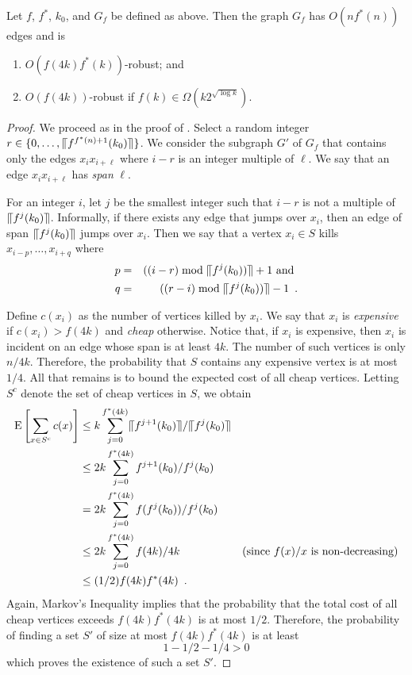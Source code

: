 \documentclass{patmorin}
\begin{document}
\begin{thm}
  Let $f$, $f^*$, $k_0$, and $G_f$ be defined as above.  Then the graph
  $G_f$ has $O(nf^*(n))$ edges and is
  \begin{enumerate}
    \item $O(f(4k)f^*(k))$-robust; and 
    \item $O(f(4k))$-robust if $f(k)\in\Omega(k2^{\sqrt{\log k}})$.
  \end{enumerate}
\end{thm}

\begin{proof}
  We proceed as in the proof of .  Select a random
  integer $r\in\{0,\ldots,\llceil f^{f^*(n)+1}(k_0)\rrceil\}$.  We consider the
  subgraph $G'$ of $G_f$ that contains only the edges $x_ix_{i+\ell}$
  where $i-r$ is an integer multiple of $\ell$.  We say that an edge
  $x_ix_{i+\ell}$ has \emph{span} $\ell$.

  For an integer $i$, let $j$ be the smallest integer such that $i-r$ is
  not a multiple of $\llceil f^j(k_0)\rrceil$.  Informally, if there exists any
  edge that jumps over $x_i$, then an edge of span $\llceil f^j(k_0)\rrceil$
  jumps over $x_i$.  Then we say that a vertex $x_i\in S$ kills
  $x_{i-p},\ldots,x_{i+q}$ where
  \begin{eqnarray*}
     p&=& ((i-r) \bmod \llceil f^j(k_0))\rrceil+1 \text{ and } \\
     q&=& ((r-i) \bmod \llceil f^j(k_0))\rrceil-1 \enspace .
  \end{eqnarray*}
  
  Define $c(x_i)$ as the number of vertices killed by $x_i$.  We say
  that $x_i$ is \emph{expensive} if $c(x_i) > f(4k)$ and \emph{cheap}
  otherwise.  Notice that, if $x_i$ is expensive, then $x_i$ is incident
  on an edge whose span is at least $4k$.  The number of such vertices
  is only $n/4k$.  Therefore, the probability that $S$ contains any
  expensive vertex is at most $1/4$.  All that remains is to bound the
  expected cost of all cheap vertices. Letting $S^c$ denote the set of
  cheap vertices in $S$, we obtain
  \begin{align*}
     \mathrm{E}\left[\sum_{x\in S^c} c(x)\right] 
      & \le  k \sum_{j=0}^{f^*(4k)} \llceil f^{j+1}(k_0)\rrceil/\llceil f^j(k_0)\rrceil \\
      & \le  2k \sum_{j=0}^{f^*(4k)} f^{j+1}(k_0)/f^j(k_0) \\
      & =  2k \sum_{j=0}^{f^*(4k)} f(f^{j}(k_0))/f^j(k_0) \\
      & \le  2k \sum_{j=0}^{f^*(4k)} f(4k)/4k 
           & \text{(since $f(x)/x$ is non-decreasing)} \\
      & \le  (1/2)f(4k)f^*(4k) \enspace .
  \end{align*}
  Again, Markov's Inequality implies that the probability that the total
  cost of all cheap vertices exceeds $f(4k)f^*(4k)$ is at most $1/2$.
  Therefore, the probability of finding a set $S'$ of size at most
  $f(4k)f^*(4k)$ is at least
  \[  
     1 - 1/2 - 1/4 > 0 
  \]
  which proves the existence of such a set $S'$.
  

\end{proof}
\end{document}
